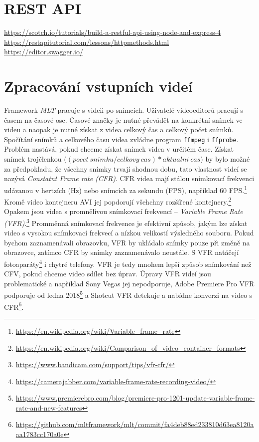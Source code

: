 \section{REST API}
\url{https://scotch.io/tutorials/build-a-restful-api-using-node-and-express-4}\\
\url{https://restapitutorial.com/lessons/httpmethods.html}\\
\url{https://editor.swagger.io/}

\section{Zpracování vstupních videí}
Framework \textit{MLT} pracuje s videii po snímcích. Uživatelé videoeditorů pracují s časem na časové ose. Časové značky je nutné převádět na konkrétní snímek ve videu a naopak je nutné získat z videa celkový čas a celkový počet snímků. Spočítání snímků a celkového času videa zvládne program \texttt{ffmpeg} i \texttt{ffprobe}. Problém nastává, pokud chceme získat snímek videa v určitém čase. Získat snímek trojčlenkou ($ (pocet\ snimku / celkovy\ cas) * aktualni\ cas $) by bylo možné za předpokladu, že všechny snímky trvají shodnou dobu, tato vlastnost videí se nazývá \textit{Constatnt Frame rate (CFR)}. CFR videa mají stálou snímkovací frekvenci udávanou v hertzích (Hz) nebo snímcích za sekundu (FPS), například 60 FPS.\footnote{\url{https://en.wikipedia.org/wiki/Variable_frame_rate}} Kromě video kontejneru AVI jej popdorují všehchny rozšířené kontejnery.\footnote{\url{https://en.wikipedia.org/wiki/Comparison_of_video_container_formats}} Opakem jsou videa s promnělivou snímkovací frekvencí -- \textit{Variable Frame Rate (VFR)}.\footnote{\url{https://www.bandicam.com/support/tips/vfr-cfr/}} Promměnná snímkovací frekvence je efektivní způsob, jakým lze získat video s vysokou snímkovací frekvecí a nízkou velikostí výsledného souboru. Pokud bychom zaznamenávali obrazovku, VFR by ukládalo snímky pouze při změně na obrazovce, zatímco CFR by snímky zaznamenávalo neustále. S VFR natáčejí fotoaparáty\footnote{\url{https://camerajabber.com/variable-frame-rate-recording-video/}} i chytré telefony. VFR je tedy mnohem lepší způsob snímkování než CFV, pokud chceme video sdílet bez úprav. Úpravy VFR videí jsou problematické a například Sony Vegas jej nepodporuje, Adobe Premiere Pro VFR podporuje od ledna 2018\footnote{\url{https://www.premierebro.com/blog/premiere-pro-1201-update-variable-frame-rate-and-new-features}} a Shotcut VFR detekuje a nabídne konverzi na video s CFR\footnote{\url{https://github.com/mltframework/mlt/commit/fa4deb88ed233810d63ea8120aaa1783cc170a0e}}.

